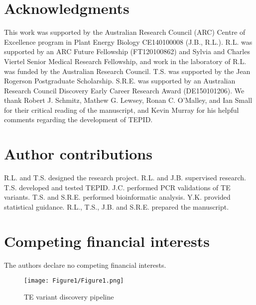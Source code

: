 \documentclass[12pt]{article}
\begin{document}
\section{Acknowledgments}

This work was supported by the Australian Research Council (ARC) Centre
of Excellence program in Plant Energy Biology CE140100008 (J.B., R.L.).
R.L. was supported by an ARC Future Fellowship (FT120100862) and Sylvia
and Charles Viertel Senior Medical Research Fellowship, and work in the
laboratory of R.L. was funded by the Australian Research Council. T.S.
was supported by the Jean Rogerson Postgraduate Scholarship. S.R.E. was
supported by an Australian Research Council Discovery Early Career
Research Award (DE150101206). We thank Robert J. Schmitz, Mathew G.
Lewsey, Ronan C. O'Malley, and Ian Small for their critical reading of
the manuscript, and Kevin Murray for his helpful comments regarding the
development of TEPID.

\section{Author contributions}

R.L. and T.S. designed the research project. R.L. and J.B. supervised
research. T.S. developed and tested TEPID. J.C. performed PCR
validations of TE variants. T.S. and S.R.E. performed bioinformatic
analysis. Y.K. provided statistical guidance. R.L., T.S., J.B. and
S.R.E. prepared the manuscript.

\section{Competing financial interests}

The authors declare no competing financial interests.

\pagebreak

\printbibliography

%


\pagebreak

\begin{figure}[h]
  \centering
  \texttt{[image: Figure1/Figure1.png]}
  \caption{TE variant discovery pipeline}
  \label{fig1}
\end{figure}
\end{document}
